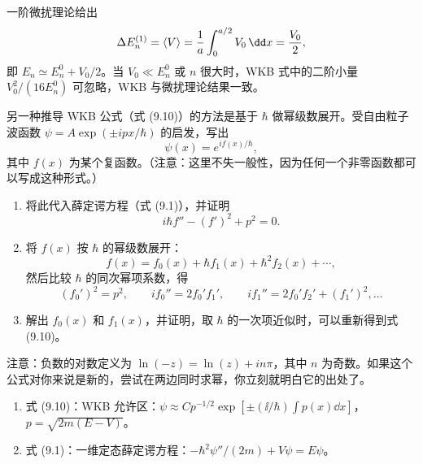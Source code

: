 \begin{solution}
一阶微扰理论给出
\[
\Delta E_n^{(1)}=\langle V\rangle
={1\over a}\int_0^{a/2}V_0\,\dd x={V_0\over2},
\]
即 $E_n\simeq E_n^0+V_0/2$。当 $V_0\ll E_n^0$ 或 $n$ 很大时，WKB 式中的二阶小量 $V_0^2/(16E_n^0)$ 可忽略，WKB 与微扰理论结果一致。
\end{solution}

\begin{question}
另一种推导 WKB 公式（式 (9.10)）的方法是基于 $\hbar$ 做幂级数展开。受自由粒子波函数 $\psi=A\exp(\pm ipx/\hbar)$ 的启发，写出
\[
\psi(x)=e^{if(x)/\hbar},
\]
其中 $f(x)$ 为某个复函数。（注意：这里不失一般性，因为任何一个非零函数都可以写成这种形式。）
\begin{enumerate}
\item 将此代入薛定谔方程（式 (9.1)），并证明
\[
i\hbar f''-(f')^2+p^2=0.
\]
\item 将 $f(x)$ 按 $\hbar$ 的幂级数展开：
\[
f(x)=f_0(x)+\hbar f_1(x)+\hbar^2f_2(x)+\cdots,
\]
然后比较 $\hbar$ 的同次幂项系数，得
\[
(f_0')^2=p^2,\qquad if_0''=2f_0'f_1',\qquad if_1''=2f_0'f_2'+(f_1')^2,\ldots
\]
\item 解出 $f_0(x)$ 和 $f_1(x)$，并证明，取 $\hbar$ 的一次项近似时，可以重新得到式 (9.10)。
\end{enumerate}
注意：负数的对数定义为 $\ln(-z)=\ln(z)+in\pi$，其中 $n$ 为奇数。如果这个公式对你来说是新的，尝试在两边同时求幂，你立刻就明白它的出处了。

\par\smallskip
{}
\begin{enumerate}[leftmargin=2.2em,itemsep=0.12em,topsep=0.12em,parsep=0pt]
\item 式 (9.10)：WKB 允许区：$\psi\approx C p^{-1/2}\exp[\pm(\ii/\hbar)\int p(x)\dd x]$，$p=\sqrt{2m(E-V)}$。
\item 式 (9.1)：一维定态薛定谔方程：$-\hbar^2\psi''/(2m)+V\psi=E\psi$。
\end{enumerate}

\end{question}
